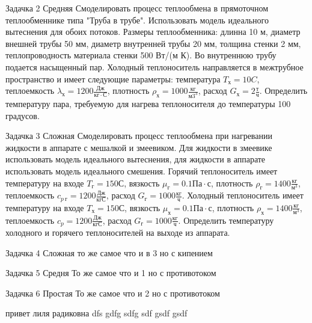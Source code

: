 Задачка 2 Средняя
Смоделировать процесс теплообмена в прямоточном теплообменнике типа "Труба в трубе". Использовать модель идеального вытеснения для обоих потоков. Размеры теплообменника: длинна 10 м, диаметр внешней трубы 50 мм, диаметр внутренней трубы 20 мм, толщина стенки 2 мм, теплопроводность материала стенки 500 Вт/(м К). Во внутреннюю трубу подается насыщенный пар. Холодный теплоноситель направляется в межтрубное пространство и имеет следующие параметры: температура $T_х=10 C$, теплоемкость $\lambda_х=1200\frac{Дж}{кг \cdot С}$, плотность $\rho_х=1000 \frac{кг}{м3^3}$, расход $G_х=2 \frac{т}{ч}$.
Определить температуру пара, требуемую для нагрева теплоносителя до температуры 100 градусов. 

Задачка 3 Сложная
Смоделировать процесс теплообмена при нагревании жидкости в аппарате с мешалкой и змеевиком. Для жидкости в змеевике использовать модель идеального вытеснения, для жидкости в аппарате использовать модель идеального смешения. Горячий теплоноситель имеет температуру на входе $T_г=150 С$, вязкость $\mu_г=0.1 Па\cdot с$, плотность  $\rho_г= 1400 \frac{кг}{м^3}$, теплоемкость $c_{p\ г}=1200 \frac{Дж}{кг С}$, расход $G_г=1000 \frac{кг}{ч}$. Холодный теплоноситель имеет температуру на входе $T_х=150 С$, вязкость $\mu_х=0.1 Па\cdot с$, плотность  $\rho_х= 1400 \frac{кг}{м^3}$, теплоемкость $c_p=1200 \frac{Дж}{кг С}$, расход $G_г=1000 \frac{кг}{ч}$. Определить температуру холодного и горячего теплоносителей на выходе из аппарата.

Задачка 4 Сложная то же самое что и в 3 но с кипением

Задачка 5 Средня То же самое что и 1 но с противотоком

Задачка 6 Простая То же самое что и 2 но с противотоком

привет лиля радиковна
dfs gdfg sdfg sdf gsdf gsdf 
